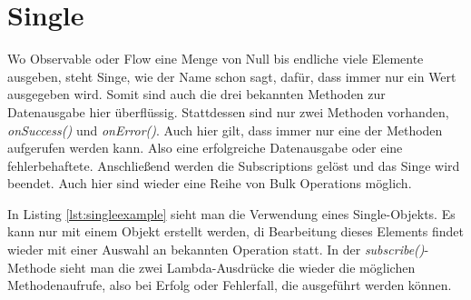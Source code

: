 \section{Single}
Wo Observable oder Flow eine Menge von Null bis endliche viele Elemente ausgeben, steht Singe, wie der Name schon sagt, dafür, dass immer nur ein Wert ausgegeben wird. Somit sind auch die drei bekannten Methoden zur Datenausgabe hier überflüssig. Stattdessen sind nur zwei Methoden vorhanden, \textit{onSuccess()} und \textit{onError()}. Auch hier gilt, dass immer nur eine der Methoden aufgerufen werden kann. Also eine erfolgreiche Datenausgabe oder eine fehlerbehaftete. Anschließend werden die Subscriptions gelöst und das Singe wird beendet. Auch hier sind wieder eine Reihe von Bulk Operations möglich. 

In Listing \ref{lst:singleexample} sieht man die Verwendung eines Single-Objekts. Es kann nur mit einem Objekt erstellt werden, di Bearbeitung dieses Elements findet wieder mit einer Auswahl an bekannten Operation statt. In der \textit{subscribe()}-Methode sieht man die zwei Lambda-Ausdrücke die wieder die möglichen Methodenaufrufe, also bei Erfolg oder Fehlerfall, die ausgeführt werden können.
